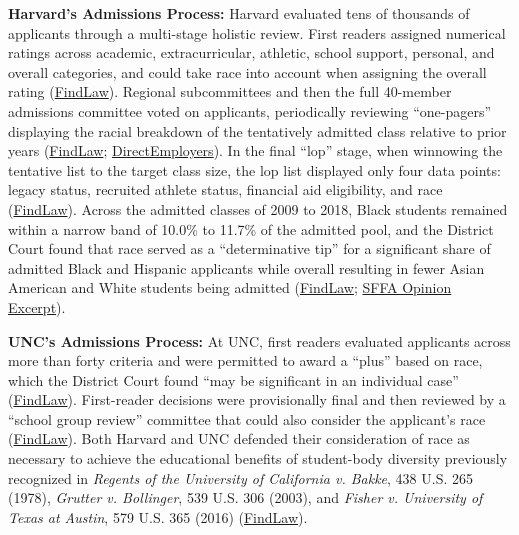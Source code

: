 \documentclass[12pt]{article}
\begin{document}
\textbf{Harvard's Admissions Process:} Harvard evaluated tens of thousands of applicants through a multi-stage holistic review. First readers assigned numerical ratings across academic, extracurricular, athletic, school support, personal, and overall categories, and could take race into account when assigning the overall rating (\href{https://caselaw.findlaw.com/court/us-supreme-court/20-1199.html}{FindLaw}). Regional subcommittees and then the full 40-member admissions committee voted on applicants, periodically reviewing ``one-pagers'' displaying the racial breakdown of the tentatively admitted class relative to prior years (\href{https://caselaw.findlaw.com/court/us-supreme-court/20-1199.html}{FindLaw}; \href{https://directemployers.org/2023/07/03/scotus-ends-its-45-year-detour-around-the-equal-protection-clause-by-now-finding-race-based-admissions-practices-at-harvard-and-unc-unlawful/}{DirectEmployers}). In the final ``lop'' stage, when winnowing the tentative list to the target class size, the lop list displayed only four data points: legacy status, recruited athlete status, financial aid eligibility, and race (\href{https://caselaw.findlaw.com/court/us-supreme-court/20-1199.html}{FindLaw}). Across the admitted classes of 2009 to 2018, Black students remained within a narrow band of 10.0\% to 11.7\% of the admitted pool, and the District Court found that race served as a ``determinative tip'' for a significant share of admitted Black and Hispanic applicants while overall resulting in fewer Asian American and White students being admitted (\href{https://caselaw.findlaw.com/court/us-supreme-court/20-1199.html}{FindLaw}; \href{https://tikvah.org/wp-content/uploads/2026/05/Students-for-Fair-Admissions.pdf}{SFFA Opinion Excerpt}).

\textbf{UNC's Admissions Process:} At UNC, first readers evaluated applicants across more than forty criteria and were permitted to award a ``plus'' based on race, which the District Court found ``may be significant in an individual case'' (\href{https://caselaw.findlaw.com/court/us-supreme-court/20-1199.html}{FindLaw}). First-reader decisions were provisionally final and then reviewed by a ``school group review'' committee that could also consider the applicant's race (\href{https://caselaw.findlaw.com/court/us-supreme-court/20-1199.html}{FindLaw}). Both Harvard and UNC defended their consideration of race as necessary to achieve the educational benefits of student-body diversity previously recognized in \textit{Regents of the University of California v. Bakke}, 438 U.S. 265 (1978), \textit{Grutter v. Bollinger}, 539 U.S. 306 (2003), and \textit{Fisher v. University of Texas at Austin}, 579 U.S. 365 (2016) (\href{https://caselaw.findlaw.com/court/us-supreme-court/20-1199.html}{FindLaw}).
\end{document}
